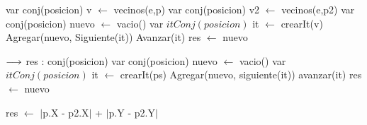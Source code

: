 \begin{algorithm}[H]
\begin{algorithmic}[1]
 
    \State  var conj(posicion) v $\gets$ vecinos(e,p) 
    \State  var conj(posicion) v2 $\gets$ vecinos(e,p2)  
    \State  var conj(posicion) nuevo $\gets$ vacio() 
    \State var $itConj(posicion)$ it $\gets$ crearIt(v) 
     
       
        \State Agregar(nuevo, Siguiente(it))	
       \EndIf
       \State Avanzar(it) 
    \EndWhile
 \State res $\gets$ nuevo     
\EndFunction
\end{algorithmic}
\end{algorithm}

\begin{algorithm}[H]
\begin{algorithmic}[1]
 {$\longrightarrow$ res : conj(posicion)} 
    \State  var conj(posicion) nuevo $\gets$ vacio() 
    \State var $itConj(posicion)$ it $\gets$ crearIt(ps) 
      
       
        \State Agregar(nuevo, siguiente(it))
      \EndIf
      \State avanzar(it) 
    \EndWhile
 \State res $\gets$ nuevo     
\EndFunction
\end{algorithmic}
\end{algorithm}

\begin{algorithm}[H]
\begin{algorithmic}[1]
 
    \State res $\gets$ $\mid$p.X - p2.X$\mid$ + $\mid$p.Y - p2.Y$\mid$     
\EndFunction
\end{algorithmic}
\end{algorithm}

